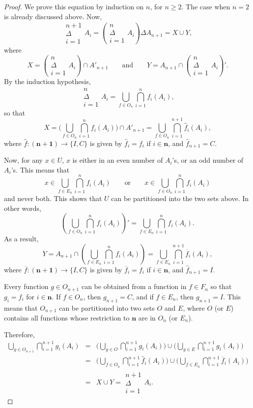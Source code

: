 \documentclass[12pt]{article}
\newcommand{\symsum}[2]{\substack{ {#2} \\ \displaystyle{\Delta} \\ {#1} }}
\begin{document}
\begin{proof}  We prove this equation by induction on $n$, for $n\ge 2$.  The case when $n=2$ is already discussed above.  Now, $$\displaystyle{\symsum{i=1}{n+1} A_i} = \left(\displaystyle{\symsum{i=1}{n} A_i}\right) \Delta A_{n+1} =  X\cup Y,$$ where $$X = \left(\displaystyle{\symsum{i=1}{n} A_i}\right)\cap A'_{n+1} \qquad \mbox{and} \qquad Y=   A_{n+1} \cap \left( \displaystyle{\symsum{i=1}{n} A_i}\right)'.$$
By the induction hypothesis, $$\displaystyle{\symsum{i=1}{n} A_i} = \bigcup_{f\in O_n} \bigcap_{i=1}^n f_i(A_i),$$ so that $$X = \bigg( \bigcup_{f\in O_n} \bigcap_{i=1}^n f_i(A_i) \bigg) \cap A'_{n+1} = \bigcup_{f\in O_n} \bigcap_{i=1}^{n+1} \hat{f}_i(A_i), $$ where $\hat{f}:\mathbf{(n+1)}\to \lbrace I,C\rbrace$ is given by $\hat{f}_i=f_i$ if $i\in \mathbf{n}$, and $\hat{f}_{n+1}=C$.

Now, for any $x\in U$, $x$ is either in an even number of $A_i$'s, or an odd number of $A_i$'s.  This means that $$x\in \bigcup_{f\in E_n} \bigcap_{i=1}^n f_i(A_i) \qquad \mbox{or} \qquad x\in \bigcup_{f\in O_n} \bigcap_{i=1}^n f_i(A_i)$$
and never both.  This shows that $U$ can be partitioned into the two sets above.  In other words, $$\left( \bigcup_{f\in O_n} \bigcap_{i=1}^n f_i(A_i) \right)' = \bigcup_{f\in E_n} \bigcap_{i=1}^n f_i(A_i).$$
As a result,
$$Y = A_{n+1} \cap \left( \bigcup_{f\in E_n} \bigcap_{i=1}^n f_i(A_i) \right)= \bigcup_{f\in E_n} \bigcap_{i=1}^{n+1} \overline{f}_i(A_i), $$ where $\overline{f}:\mathbf{(n+1)}\to \lbrace I,C\rbrace$ is given by $\overline{f}_i=f_i$ if $i\in \mathbf{n}$, and $\hat{f}_{n+1}=I$.

Every function $g\in O_{n+1}$ can be obtained from a function in $f\in F_n$ so that $g_i=f_i$ for $i\in \mathbf{n}$.  If $f\in O_n$, then $g_{n+1}=C$, and if $f\in E_n$, then $g_{n+1}=I$.  This means that $O_{n+1}$ can be partitioned into two sets $O$ and $E$, where $O$ (or $E$) contains all functions whose restriction to $\mathbf{n}$ are in $O_n$ (or $E_n$).

Therefore, 
\begin{eqnarray*}
\bigcup_{g\in O_{n+1}} \bigcap_{i=1}^{n+1} g_i(A_i) &=&  \bigg(\bigcup_{g\in O} \bigcap_{i=1}^{n+1} g_i(A_i)\bigg) \cup \bigg( \bigcup_{g\in E} \bigcap_{i=1}^{n+1} g_i(A_i)\bigg) \\ &=&  \bigg(\bigcup_{f\in O_n} \bigcap_{i=1}^{n+1} \hat{f}_i(A_i)\bigg) \cup \bigg( \bigcup_{f\in E_n} \bigcap_{i=1}^{n+1} \overline{f}_i(A_i)\bigg) \\ &=& X\cup Y = \displaystyle{\symsum{i=1}{n+1} A_i}.
\end{eqnarray*}
\end{proof}
\end{document}
